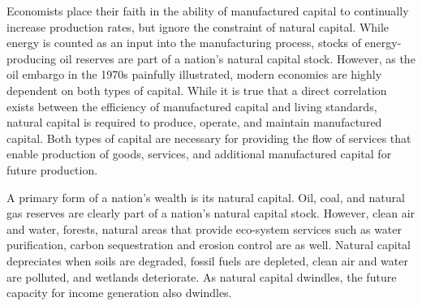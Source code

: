 Economists place their faith in the ability of manufactured capital 
to continually increase production rates, 
but ignore the constraint  of natural capital. While
energy is counted as an input into the manufacturing process,
stocks of energy-producing oil reserves are part of
a nation's natural capital stock.
However, as the oil embargo in the 1970s 
painfully illustrated, modern economies are highly dependent on both types of capital.
While it is true that a direct correlation exists between the efficiency of manufactured capital
and living standards, natural capital is required 
to produce, operate, and maintain manufactured capital. 
Both types of capital are necessary for providing 
the flow of services that enable production of 
goods, services, and additional manufactured capital for future production.

A primary form of a nation's wealth is its natural capital. 
Oil, coal, and natural gas reserves are clearly
part of a nation's natural capital stock. However, clean air and water, forests, natural
areas that provide eco-system services such 
as water purification, carbon sequestration and erosion control
are as well.
Natural capital depreciates when 
soils are degraded, 
fossil fuels are depleted, 
clean air and water are polluted, 
and wetlands deteriorate. 
As natural capital dwindles, the future
capacity for income generation also dwindles. 


